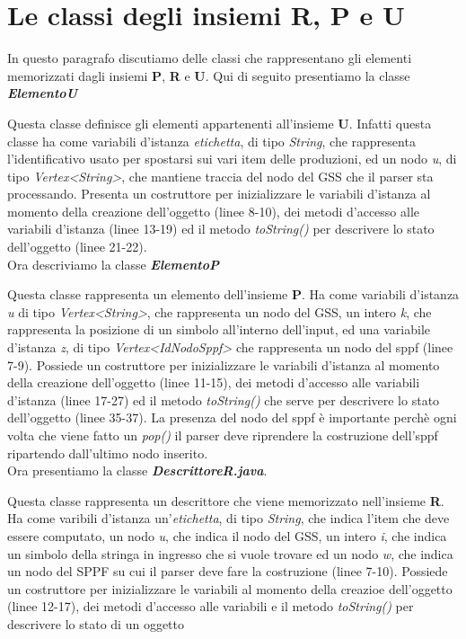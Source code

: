 \section{Le classi degli insiemi R, P e U}
In questo paragrafo discutiamo delle classi che rappresentano gli elementi memorizzati dagli insiemi \textbf{P}, \textbf{R} e \textbf{U}. Qui di seguito presentiamo la classe \textbf{\textit{ElementoU}}

Questa classe definisce gli elementi appartenenti all'insieme \textbf{U}. Infatti questa classe ha come variabili d'istanza \textit{etichetta}, di tipo \textit{String}, che rappresenta l'identificativo usato per spostarsi sui vari item delle produzioni, ed un nodo \textit{u}, di tipo \textit{Vertex<String>}, che mantiene traccia del nodo del GSS che il parser sta processando. Presenta un costruttore per inizializzare le variabili d'istanza al momento della creazione dell'oggetto (linee 8-10), dei metodi d'accesso alle variabili d'istanza (linee 13-19) ed il metodo \textit{ toString()} per descrivere lo stato dell'oggetto (linee 21-22).\\
Ora descriviamo la classe \textbf{\textit{ElementoP}}

Questa classe rappresenta un elemento dell'insieme \textbf{P}. Ha come variabili d'istanza \textit{u} di tipo \textit{Vertex<String>}, che rappresenta un nodo del GSS, un intero \textit{k}, che rappresenta la posizione di un simbolo all'interno dell'input, ed una variabile d'istanza \textit{z}, di tipo \textit{Vertex<IdNodoSppf>} che rappresenta un nodo del sppf (linee 7-9). Possiede un costruttore  per inizializzare le variabili d'istanza al momento della creazione dell'oggetto (linee 11-15), dei metodi d'accesso alle variabili d'istanza (linee 17-27) ed il metodo \textit{toString()} che serve per descrivere lo stato dell'oggetto (linee 35-37). La presenza del nodo del sppf è importante perchè ogni volta che viene fatto un \textit{pop()} il parser deve riprendere la costruzione dell'sppf ripartendo dall'ultimo nodo inserito.\\
Ora presentiamo la classe \textbf{\textit{DescrittoreR.java}}.

Questa classe rappresenta un descrittore che viene memorizzato nell'insieme \textbf{R}. Ha come varibili d'istanza un'\textit{etichetta}, di tipo \textit{String}, che indica l'item che deve essere computato, un nodo \textit{u}, che indica il nodo del GSS, un intero \textit{i}, che indica un simbolo della stringa in ingresso che si vuole trovare ed un nodo \textit{w}, che indica un nodo del SPPF su cui il parser deve fare la costruzione (linee 7-10). Possiede un costruttore per inizializzare le variabili al momento della creazioe dell'oggetto (linee 12-17), dei metodi d'accesso alle variabili e il metodo \textit{toString()} per descrivere lo stato di un oggetto
